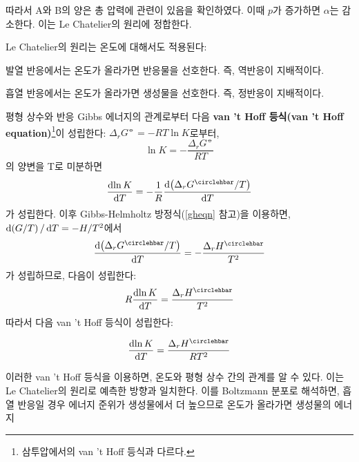         따라서 A와 B의 양은 총 압력에 관련이 있음을 확인하였다. 이때 $p$가 증가하면 $\alpha$는 감소한다. 이는 Le Chatelier의 원리에 정합한다.
        \par Le Chatelier의 원리는 온도에 대해서도 적용된다:
        \begin{enum}
            \item 발열 반응에서는 온도가 올라가면 반응물을 선호한다. 즉, 역반응이 지배적이다.
            \item 흡열 반응에서는 온도가 올라가면 생성물을 선호한다. 즉, 정반응이 지배적이다.
        \end{enum}
        \par 평형 상수와 반응 Gibbs 에너지의 관계로부터 다음 \textbf{van 't Hoff 등식(van 't Hoff equation)}\footnote[15]{삼투압에서의 van 't Hoff 등식과 다르다.}이 성립한다: 
        $\Delta_r G^\circlehbar = -RT \ln{K}$로부터, 
        \begin{equation*}
            \ln{K}=-\frac{\Delta_r G^\circlehbar}{RT}
        \end{equation*}
        의 양변을 T로 미분하면
        \begin{equation*}
            \frac{\difform \ln{K}}{\difform T}=-\frac{1}{R}\frac{\difform \left(\Delta_r G^\circlehbar /T\right)}{\difform T}
        \end{equation*}
        가 성립한다. 이후 Gibbs-Helmholtz 방정식(\ref{gheqn} 참고)을 이용하면, $\operatorname{d\!} \left(G/T\right)/\operatorname{d\!} T=-H/T^2$에서 
        \begin{equation*}
            \frac{\difform \left(\Delta_r G^\circlehbar /T\right)}{\difform T}=-\frac{\Delta_r H^\circlehbar}{T^2}
        \end{equation*}
        가 성립하므로, 다음이 성립한다:
        \begin{equation*}
            R\frac{\difform \ln{K}}{\difform T}=\frac{\Delta_r H^\circlehbar}{T^2}
        \end{equation*}
        따라서 다음 van 't Hoff 등식이 성립한다:
        \begin{law}
        \begin{equation*}
            \frac{\difform \ln{K}}{\difform T}=\frac{\Delta_r H^\circlehbar}{RT^2}
        \end{equation*}
        \end{law}
        \par 이러한 van 't Hoff 등식을 이용하면, 온도와 평형 상수 간의 관계를 알 수 있다. 이는 Le Chatelier의 원리로 예측한 방향과 
        일치한다. 이를 Boltzmann 분포로 해석하면, 흡열 반응일 경우 에너지 준위가 생성물에서 더 높으므로 온도가 올라가면 생성물의 에너지 
